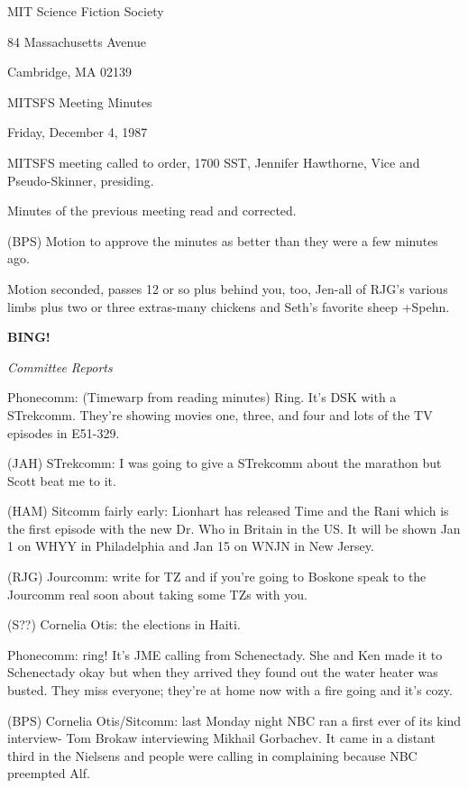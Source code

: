 \documentclass[12pt]{article}
\newcommand{\bing}{{\bf BING!} }
\newcommand{\goto}[1]{\bing \vskip 12pt \centerline{{\em{#1}}}}
\begin{document}
\begin{center}

MIT Science Fiction Society 

84 Massachusetts Avenue

Cambridge, MA 02139

\vspace{12pt}

MITSFS Meeting Minutes 

Friday, December 4, 1987

\end{center}
 
\vspace{18pt}

\setlength{\parskip}{6pt}

\noindent
MITSFS meeting called to order, 1700 SST,
Jennifer Hawthorne, Vice and Pseudo-Skinner, presiding.

Minutes of the previous meeting read and corrected.

(BPS) Motion to approve the minutes as better than they were a few minutes ago.

Motion seconded, passes 12 or so plus behind you, too, Jen-all of RJG's various limbs plus two or three extras-many chickens and Seth's favorite sheep +Spehn.

\goto{Committee Reports}

Phonecomm: (Timewarp from reading minutes) Ring. It's DSK with a STrekcomm. They're showing movies one, three, and four and lots of the TV episodes in E51-329.

(JAH) STrekcomm: I was going to give a STrekcomm about the marathon but Scott beat me to it.

(HAM) Sitcomm fairly early: Lionhart has released Time and the Rani which is the first episode with the new Dr. Who in Britain in the US. It will be shown Jan 1 on WHYY in Philadelphia and Jan 15 on WNJN in New Jersey.

(RJG) Jourcomm: write for TZ and if you're going to Boskone speak to the Jourcomm real soon about taking some TZs with you.

(S??) Cornelia Otis: the elections in Haiti.

Phonecomm: ring! It's JME calling from Schenectady. She and Ken made it to Schenectady okay but when they arrived they found out the water heater was busted. They miss everyone; they're at home now with a fire going and it's cozy.

(BPS) Cornelia Otis/Sitcomm: last Monday night NBC ran a first ever of its kind interview- Tom Brokaw interviewing Mikhail Gorbachev. It came in a distant third in the Nielsens and people were calling in complaining because NBC preempted Alf.
\end{document}
